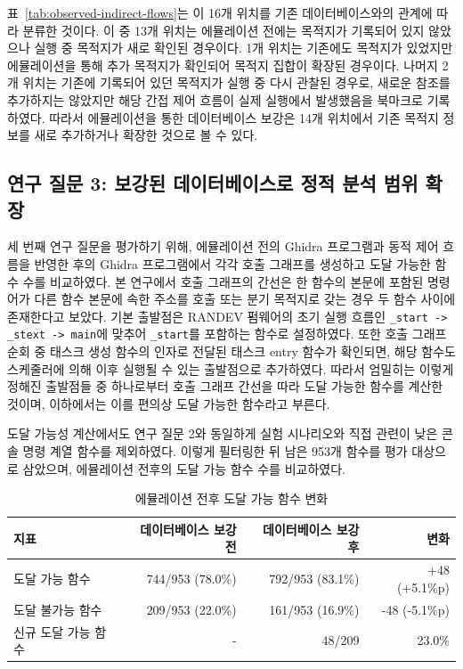 \documentclass[master,korean,final]{kaist-ucs}
\begin{document}
표~\ref{tab:observed-indirect-flows}는 이 16개 위치를 기존 데이터베이스와의 관계에 따라 분류한 것이다. 이 중 13개 위치는 에뮬레이션 전에는 목적지가 기록되어 있지 않았으나 실행 중 목적지가 새로 확인된 경우이다. 1개 위치는 기존에도 목적지가 있었지만 에뮬레이션을 통해 추가 목적지가 확인되어 목적지 집합이 확장된 경우이다. 나머지 2개 위치는 기존에 기록되어 있던 목적지가 실행 중 다시 관찰된 경우로, 새로운 참조를 추가하지는 않았지만 해당 간접 제어 흐름이 실제 실행에서 발생했음을 북마크로 기록하였다. 따라서 에뮬레이션을 통한 데이터베이스 보강은 14개 위치에서 기존 목적지 정보를 새로 추가하거나 확장한 것으로 볼 수 있다.

\subsection{연구 질문 3: 보강된 데이터베이스로 정적 분석 범위 확장}

세 번째 연구 질문을 평가하기 위해, 에뮬레이션 전의 Ghidra 프로그램과 동적 제어 흐름을 반영한 후의 Ghidra 프로그램에서 각각 호출 그래프를 생성하고 도달 가능한 함수 수를 비교하였다. 본 연구에서 호출 그래프의 간선은 한 함수의 본문에 포함된 명령어가 다른 함수 본문에 속한 주소를 호출 또는 분기 목적지로 갖는 경우 두 함수 사이에 존재한다고 보았다. 기본 출발점은 RANDEV 펌웨어의 초기 실행 흐름인 \texttt{\_start -> \_stext -> main}에 맞추어 \texttt{\_start}를 포함하는 함수로 설정하였다. 또한 호출 그래프 순회 중 태스크 생성 함수의 인자로 전달된 태스크 entry 함수가 확인되면, 해당 함수도 스케줄러에 의해 이후 실행될 수 있는 출발점으로 추가하였다. 따라서 엄밀히는 이렇게 정해진 출발점들 중 하나로부터 호출 그래프 간선을 따라 도달 가능한 함수를 계산한 것이며, 이하에서는 이를 편의상 도달 가능한 함수라고 부른다.

도달 가능성 계산에서도 연구 질문 2와 동일하게 실험 시나리오와 직접 관련이 낮은 콘솔 명령 계열 함수를 제외하였다. 이렇게 필터링한 뒤 남은 953개 함수를 평가 대상으로 삼았으며, 에뮬레이션 전후의 도달 가능 함수 수를 비교하였다.

\begin{table}[t]
\caption{에뮬레이션 전후 도달 가능 함수 변화}
\label{tab:reachable-functions}
\begin{center}
\begin{tabular}{lrrr}
\hline\hline
지표 & 데이터베이스 보강 전 & 데이터베이스 보강 후 & 변화 \\
\hline
도달 가능 함수 & 744/953 (78.0\%) & 792/953 (83.1\%) & +48 (+5.1\%p) \\
도달 불가능 함수 & 209/953 (22.0\%) & 161/953 (16.9\%) & -48 (-5.1\%p) \\
신규 도달 가능 함수 & - & 48/209 & 23.0\% \\
\hline\hline
\end{tabular}
\end{center}
\end{table}
\end{document}
